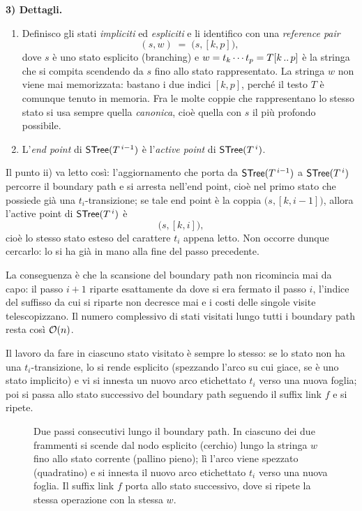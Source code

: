 \textbf{3) Dettagli.}
\begin{enumerate}
  \item[i)] Definisco gli stati \emph{impliciti} ed \emph{espliciti} e li identifico con una
    \emph{reference pair}
    \[
      (s,w)\;=\;\bigl(s,[k,p]\bigr),
    \]
    dove $s$ è uno stato esplicito (branching) e $w = t_k\cdots t_p = T[k\,..\,p]$ è la
    stringa che si compita scendendo da $s$ fino allo stato rappresentato. La stringa $w$ non
    viene mai memorizzata: bastano i due indici $[k,p]$, perché il testo $T$ è comunque tenuto
    in memoria. Fra le molte coppie che rappresentano lo stesso stato si usa sempre quella
    \emph{canonica}, cioè quella con $s$ il più profondo possibile.

  \item[ii)] L'\emph{end point} di $\textsf{STree}{}(T^{\,i-1})$ è l'\emph{active point} di
    $\textsf{STree}{}(T^{\,i})$.
\end{enumerate}

Il punto ii) va letto così: l'aggiornamento che porta da $\textsf{STree}{}(T^{\,i-1})$ a
$\textsf{STree}{}(T^{\,i})$ percorre il boundary path e si arresta nell'end point, cioè nel primo
stato che possiede già una $t_i$-transizione; se tale end point è la coppia
$\bigl(s,[k,i-1]\bigr)$, allora l'active point di $\textsf{STree}{}(T^{\,i})$ è
\[
  \bigl(s,[k,i]\bigr),
\]
cioè lo stesso stato esteso del carattere $t_i$ appena letto. Non occorre dunque cercarlo: lo
si ha già in mano alla fine del passo precedente.

La conseguenza è che la scansione del boundary path non ricomincia mai da capo: il passo
$i+1$ riparte esattamente da dove si era fermato il passo $i$, l'indice del suffisso da cui si
riparte non decresce mai e i costi delle singole visite telescopizzano. Il numero complessivo
di stati visitati lungo tutti i boundary path resta così $\mathcal{O}(n)$.

Il lavoro da fare in ciascuno stato visitato è sempre lo stesso: se lo stato non ha una
$t_i$-transizione, lo si rende esplicito (spezzando l'arco su cui giace, se è uno stato
implicito) e vi si innesta un nuovo arco etichettato $t_i$ verso una nuova foglia; poi si
passa allo stato successivo del boundary path seguendo il suffix link $f$ e si ripete.

\begin{figure}[H]
\centering

\caption{Due passi consecutivi lungo il boundary path. In ciascuno dei due frammenti si scende
dal nodo esplicito (cerchio) lungo la stringa $w$ fino allo stato corrente (pallino pieno); lì
l'arco viene spezzato (quadratino) e si innesta il nuovo arco etichettato $t_i$ verso una
nuova foglia. Il suffix link $f$ porta allo stato successivo, dove si ripete la stessa
operazione con la stessa $w$.}
\label{fig:ukkonen-boundary-step}
\end{figure}

